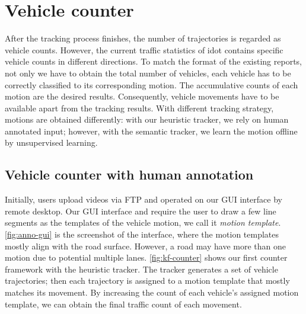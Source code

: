 \section{Vehicle counter}
\label{sec:system-counter}

After the tracking process finishes, the number of trajectories is regarded as vehicle counts.
However, the current traffic statistics of \gls{idot} contains specific vehicle counts in different directions. 
To match the format of the existing reports, not only we have to obtain the total number of vehicles, each vehicle has to be correctly classified to its corresponding motion. 
The accumulative counts of each motion are the desired results.
Consequently, vehicle movements have to be available apart from the tracking results.
With different tracking strategy, motions are obtained differently: with our heuristic tracker, we rely on human annotated input; however, with the semantic tracker, we learn the motion offline by unsupervised learning.

\subsection{Vehicle counter with human annotation}
Initially, users upload videos via FTP and operated on our GUI interface by remote desktop.
Our GUI interface and require the user to draw a few line segments as the templates of the vehicle motion, we call it \emph{motion template}.
\ref{fig:anno-gui} is the screenshot of the interface, where the motion templates mostly align with the road surface. 
However, a road may have more than one motion due to potential multiple lanes. 
\ref{fig:kf-counter} shows our first counter framework with the heuristic tracker. 
The tracker generates a set of vehicle trajectories; then each trajectory is assigned to a motion template that mostly matches its movement. 
By increasing the count of each vehicle's assigned motion template, we can obtain the final traffic count of each movement. 




